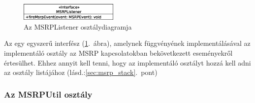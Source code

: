 \begin{figure}
  \vspace{-15pt}
  \begin{center}
    \includegraphics[width=0.43\textwidth]{img/class_diagrams/MSRPListener.eps}
  \end{center}
  \vspace{-15pt}
  \captionsetup{font=scriptsize}
  \caption{Az MSRPListener osztálydiagramja}
   \label{fig:class_listener}
  \vspace{-10pt}
\end{figure}
Az  egy egyszerű interfész (\ref{fig:class_listener}.~ábra), amelynek  függvényének implementálásával az implementáló osztály az MSRP kapcsolatokban bekövetkezett eseményekről értesülhet. Ehhez annyit kell tenni, hogy az implementáló osztályt hozzá kell adni az  osztály  listájához (lásd.:\ref{sec:msrp_stack}.~pont)

\subsubsection*{Az MSRPUtil osztály}
\label{sec:msrp_util}

